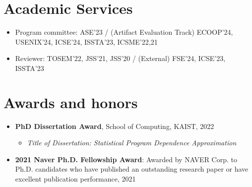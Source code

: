 \documentclass[letterpaper,11pt]{article}
\newcommand{\resumeSubHeadingListEnd}{\end{itemize}}
\begin{document}


\section{Academic Services}
\begin{itemize}
  
  \item Program committee: ASE'23 / (Artifact Evaluation Track) ECOOP'24, USENIX'24, ICSE'24, ISSTA'23, ICSME'22,21
  \item Reviewer: TOSEM'22, JSS'21, JSS'20  / (External) FSE'24, ICSE'23, ISSTA'23
\end{itemize}




\section{Awards and honors}
\begin{itemize}
  \item \textbf{PhD Dissertation Award}, School of Computing, KAIST, 2022
        \vspace{-5pt}\begin{itemize}
          \item \emph{Title of Dissertation: Statistical Program Dependence Approximation}
        \end{itemize}
  \item \textbf{2021 Naver Ph.D. Fellowship Award}: Awarded by NAVER Corp. to Ph.D. candidates who have published an outstanding research paper or have excellent publication performance, 2021
\end{itemize}
\end{document}
